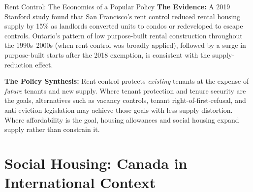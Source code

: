 \begin{casestudy}{Rent Control: The Economics of a Popular Policy}
\textbf{The Evidence:}
A 2019 Stanford study found that San Francisco's rent control reduced
rental housing supply by 15\% as landlords converted units to condos
or redeveloped to escape controls. Ontario's pattern of low purpose-built
rental construction throughout the 1990s--2000s (when rent control was
broadly applied), followed by a surge in purpose-built starts after the
2018 exemption, is consistent with the supply-reduction effect.

\textbf{The Policy Synthesis:} Rent control protects \textit{existing}
tenants at the expense of \textit{future} tenants and new supply. Where
tenant protection and tenure security are the goals, alternatives such
as vacancy controls, tenant right-of-first-refusal, and anti-eviction
legislation may achieve those goals with less supply distortion. Where
affordability is the goal, housing allowances and social housing expand
supply rather than constrain it.
\end{casestudy}

\section{Social Housing: Canada in International Context}
\label{sec:social_housing}

